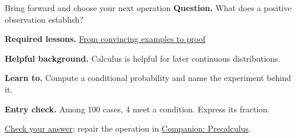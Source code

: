 \begin{learningcard}{Bring forward and choose your next operation}
\textsf{\textbf{Question.}} What does a positive observation establish?\par
\textbf{Required lessons.} \hyperref[learn:proof]{From convincing examples to proof}\par
\textbf{Helpful background.} Calculus is helpful for later continuous distributions.\par
\textbf{Learn to.} Compute a conditional probability and name the experiment behind it.\par
\textbf{Entry check.} Among 100 cases, 4 meet a condition. Express its fraction.\par
\hyperref[solution:entry:probability]{Check your answer}; repair the operation in \href{https://github.com/Oichkatzelesfrettschen/precalc_paper}{Companion: Precalculus}.
\end{learningcard}
